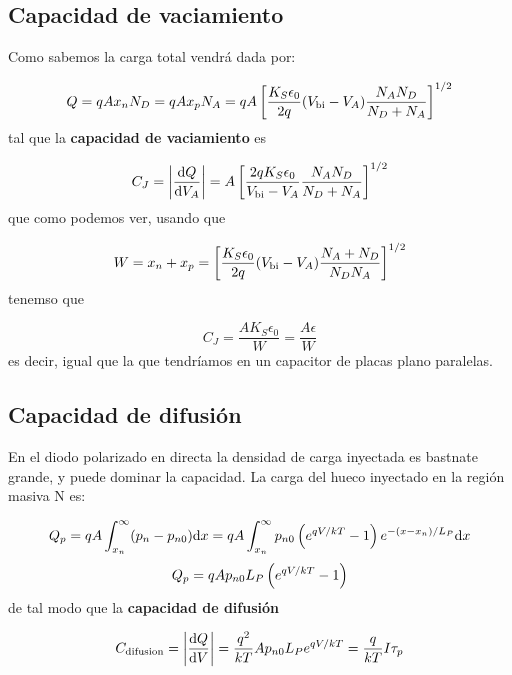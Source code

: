 \subsection{Capacidad de vaciamiento}

Como sabemos la carga total vendrá dada por: 

\begin{equation}
    Q = q A x_n N_D = q A x_p N_A = q A \left[ \frac{K_S \epsilon_0}{2q} (V_{\text{bi}}-V_A) \frac{N_AN_D}{N_D+N_A} \right]^{1/2}
\end{equation}
tal que la \textbf{capacidad de vaciamiento} es

\begin{equation}
    C_J = \abs{\frac{\mathrm{d} Q}{\mathrm{d} V_A}} = A \left[ \frac{2qK_S \epsilon_0}{V_{\text{bi}}-V_A} \frac{N_AN_D}{N_D+N_A} \right]^{1/2} 
\end{equation}
que como podemos ver, usando que

\begin{equation}
    W = x_n + x_p = \left[ \frac{K_S \epsilon_0}{2q} (V_{\text{bi}}-V_A) \frac{N_A+N_D}{N_DN_A} \right]^{1/2}
\end{equation}
tenemso que 

\begin{equation}
    C_J = \frac{AK_S\epsilon_0}{W} = \frac{A\epsilon}{W}
\end{equation}
es decir, igual que la que tendríamos en un capacitor de placas plano paralelas. 
\subsection{Capacidad de difusión}

En el diodo polarizado en directa la densidad de carga inyectada es bastnate grande, y puede dominar la capacidad. La carga del hueco inyectado en la región masiva N es: 

\begin{equation}
    Q_p = qA  \int_{x_n}^{\infty} (p_n-p_{n0} )\mathrm{d} x =  q A \int_{x_n}^{\infty} p_{n0} \left( e^{qV/kT}-1 \right) e^{-(x-x_n)/L_P} \mathrm{d} x 
\end{equation}
\begin{equation}
    Q_p = q A p_{n0} L_P  \left( e^{qV/kT}-1 \right)  
\end{equation}
de tal modo que la \textbf{capacidad de difusión}

\begin{equation}
    C_{\text{difusion}} = \abs{\frac{\mathrm{d} Q}{\mathrm{d} V}} =  \frac{q^2}{kT}A p_{n0} L_P  e^{qV/kT} = \frac{q}{kT} I \tau_p
\end{equation}


